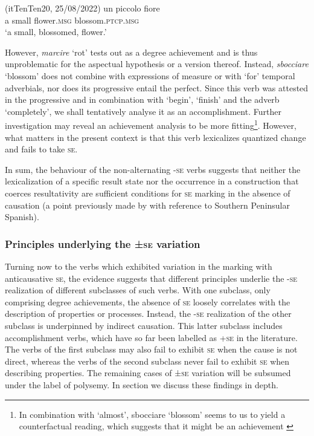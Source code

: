 \documentclass[output=paper,colorlinks,citecolor=brown
]{langscibook}
\begin{document}
\hspace*{\fill}(itTenTen20, 25/08/2022)\quad
\ea \label{bentley_example_19}
    \gll un	piccolo	fiore						   \\
    a			small			flower.\textsc{msg}	blossom.\textsc{ptcp}.\textsc{msg}	 \\
    \glt ‘a small, blossomed, flower.’
\z

However, \textit{marcire} ‘rot’ tests out as a degree achievement and is thus unproblematic for the aspectual hypothesis or a version thereof. Instead, \textit{sbocciare} ‘blossom’ does not combine with expressions of measure or with ‘for’ temporal adverbials, nor does its progressive entail the perfect. Since this verb was attested in the progressive and in combination with ‘begin’, ‘finish’ and the adverb ‘completely’, we shall tentatively analyse it as an accomplishment. Further investigation may reveal an achievement analysis to be more fitting\footnote{In combination with ‘almost’, sbocciare ‘blossom’ seems to us to yield a counterfactual reading, which suggests that it might be an achievement \citep{hay1999scalar}}.  However, what matters in the present context is that this verb lexicalizes quantized change and fails to take \textsc{se}. 

In sum, the behaviour of the non-alternating -\textsc{se} verbs suggests that neither the lexicalization of a specific result state nor the occurrence in a construction that coerces resultativity are sufficient conditions for \textsc{se} marking in the absence of causation (a point previously made by \citet{jimenez2017causativity} with reference to Southern Peninsular Spanish).  

\subsubsection{Principles underlying the ±\textsc{se} variation}
\label{bentley_section_3.3.3}
Turning now to the verbs which exhibited variation in the marking with anticausative \textsc{se}, the evidence suggests that different principles underlie the -\textsc{se} realization of different subclasses of such verbs. With one subclass, only comprising degree achievements, the absence of \textsc{se} loosely correlates with the description of properties or processes. Instead, the -\textsc{se} realization of the other subclass is underpinned by indirect causation. This latter subclass includes accomplishment verbs, which have so far been labelled as +\textsc{se} in the literature. The verbs of the first subclass may also fail to exhibit \textsc{se} when the cause is not direct, whereas the verbs of the second subclass never fail to exhibit \textsc{se} when describing properties. The remaining cases of ±\textsc{se} variation will be subsumed under the label of polysemy. In section  we discuss these findings in depth.
\end{document}
